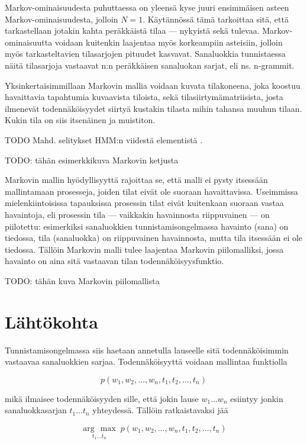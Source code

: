 \documentclass[utf8,bachelor,manualbib]{gradu3}
\newcommand{\argmax}[1]{\underset{#1}{\operatorname{arg}\,\operatorname{max}}\;}
\begin{document}
Markov-ominaisuudesta puhuttaessa on yleensä kyse juuri ensimmäisen asteen Markov-ominaisuudesta, jolloin $N=1$. Käytännössä tämä tarkoittaa sitä, että tarkastellaan jotakin kahta peräkkäistä tilaa --- nykyistä sekä tulevaa. Markov-ominaisuutta voidaan kuitenkin laajentaa myös korkeampiin asteisiin, jolloin myös tarkasteltavien tilasarjojen pituudet kasvavat. Sanaluokkia tunnistaessa näitä tilasarjoja vastaavat n:n peräkkäisen sanaluokan sarjat, eli ns. n-grammit.   

Yksinkertaisimmillaan Markovin mallia voidaan kuvata tilakoneena, joka koostuu havaittavia tapahtumia kuvaavista tiloista, sekä tilasiirtymämatriisista, josta ilmenevät todennäköisyydet siirtyä kustakin tilasta mihin tahansa muuhun tilaan. Kukin tila on siis itsenäinen ja muistiton.

TODO Mahd. selitykset HMM:n viidestä elementistä \citep{rubiner1989}.



TODO: tähän esimerkkikuva Markovin ketjusta

Markovin mallin hyödyllisyyttä rajoittaa se, että malli ei pysty itsessään mallintamaan prosesseja, joiden tilat eivät ole suoraan havaittavissa. Useimmissa mielenkiintoisissa tapauksissa prosessin tilat eivät kuitenkaan suoraan vastaa havaintoja, eli prosessin tila --- vaikkakin havainnosta riippuvainen --- on piilotettu: esimerkiksi sanaluokkien tunnistamisongelmassa havainto (sana) on tiedossa, tila (sanaluokka) on riippuvainen havainnosta, mutta tila itsessään ei ole tiedossa. Tällöin Markovin malli tulee laajentaa Markovin piilomalliksi, jossa havainto on aina sitä vastaavan tilan todennäköisyysfunktio.

TODO: tähän kuva Markovin piilomallista




\section{Lähtökohta}

Tunnistamisongelmassa siis haetaan annetulla lauseelle sitä todennäköisimmin vastaavaa sanaluokkien sarjaa. Todennäköisyyttä voidaan mallintaa funktiolla

\[
p(w_1, w_2, \ldots, w_n, t_1, t_2, \ldots, t_n)
\]

mikä ilmaisee todennäköisyyden sille, että jokin lause $ w_1 \ldots w_n $ esiintyy jonkin sanaluokkasarjan $ t_1 \ldots t_n $ yhteydessä. Tällöin ratkaistavaksi jää

\[
\argmax{t_1 \ldots t_n} p(w_1, w_2, \ldots, w_n, t_1, t_2, \ldots, t_n)
\]
\end{document}
